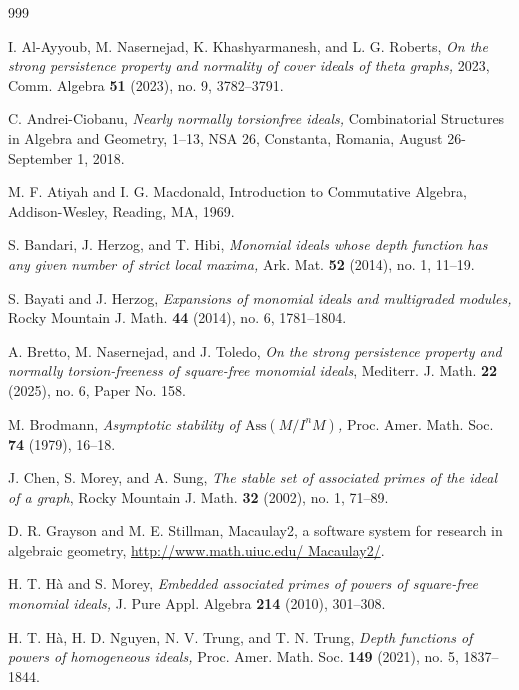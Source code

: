 \documentclass[11pt]{amsart}
\begin{document}
\vspace{1.2cm}
\begin{thebibliography}{999}

 
   I. Al-Ayyoub,  M. Nasernejad, K. Khashyarmanesh, and L. G. Roberts, {\it  On the strong persistence property and normality of cover
 ideals of theta graphs,} 2023,  Comm. Algebra {\bf 51} (2023), no. 9, 3782--3791.
 
   C. Andrei-Ciobanu, {\it Nearly normally torsionfree ideals,} Combinatorial Structures in Algebra and Geometry, 1--13, 
NSA 26, Constanta, Romania, August 26-September 1, 2018.
 
  M. F. Atiyah and I. G. Macdonald, {Introduction to Commutative Algebra}, Addison-Wesley, Reading, MA, 1969.
 
 
  S. Bandari, J. Herzog, and T.  Hibi, \textit{Monomial ideals whose depth function has any given number of strict local maxima,}
 Ark. Mat. \textbf{52} (2014), no. 1, 11--19.
 
   S.  Bayati and  J.  Herzog, \textit{Expansions of monomial ideals and multigraded modules,}  Rocky Mountain J. Math.
{\bf  44}  (2014), no. 6,  1781--1804.

   A.  Bretto,  M. Nasernejad,   and   J. Toledo, 
\textit{On the strong persistence property and normally torsion-freeness of square-free  monomial ideals}, 
 Mediterr. J. Math. \textbf{22} (2025), no. 6, Paper No. 158.


   M. Brodmann, {\it Asymptotic stability of $\mathrm{Ass}(M/I^{n}M)$,}  Proc. Amer. Math. Soc. {\bf 74} (1979),  16--18.


  J. Chen, S. Morey, and A. Sung, {\it  The stable set of associated primes of the ideal of a graph},
 Rocky Mountain J. Math. {\bf 32} (2002), no. 1, 71--89.

 

     D. R. Grayson and  M. E. Stillman, Macaulay2, a software system for research in algebraic geometry,  
\url{http://www.math.uiuc.edu/ Macaulay2/}.


   H. T. H\`a  and  S. Morey, {\it Embedded associated primes of powers of square-free monomial ideals,} J. Pure Appl. Algebra
 {\bf 214} (2010), 301--308.

 H. T. H\`a, H. D.  Nguyen, N. V.  Trung, and T. N.  Trung, \textit{Depth functions of powers of homogeneous ideals,} 
 Proc. Amer. Math. Soc. \textbf{149} (2021), no. 5, 1837--1844. 



\end{thebibliography}
\end{document}
